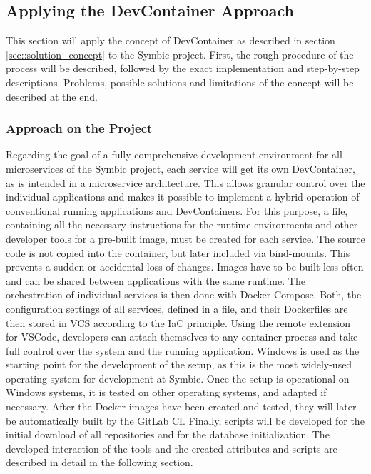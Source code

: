     \subsection{Applying the DevContainer Approach}\label{ssec::apply}
    This section will apply the concept of DevContainer as described in section \ref{sec::solution_concept} to the Symbic project. First, the rough procedure of the process will be described, followed by the exact implementation and step-by-step descriptions. Problems, possible solutions and limitations of the concept will be described at the end.

        \subsubsection{Approach on the Project}\label{ssec::imp_approach}
        Regarding the goal of a fully comprehensive development environment for all microservices of the Symbic project, each service will get its own DevContainer, as is intended in a microservice architecture. This allows granular control over the individual applications and makes it possible to implement a hybrid operation of conventional running applications and DevContainers. For this purpose, a  file, containing all the necessary instructions for the runtime environments and other developer tools for a pre-built image, must be created for each service. The source code is not copied into the container, but later included via bind-mounts. This prevents a sudden or accidental loss of changes. Images have to be built less often and can be shared between applications with the same runtime. The orchestration of individual services is then done with Docker-Compose. Both, the configuration settings of all services, defined in a  file, and their Dockerfiles are then stored in \ac{VCS} according to the \ac{IaC} principle. Using the remote extension for \ac{VSCode}, developers can attach themselves to any container process and take full control over the system and the running application.\newline
        Windows is used as the starting point for the development of the setup, as this is the most widely-used operating system for development at Symbic. Once the setup is operational on Windows systems, it is tested on other operating systems, and adapted if necessary. After the Docker images have been created and tested, they will later be automatically built by the GitLab \ac{CI}. Finally, scripts will be developed for the initial download of all repositories and for the database initialization. The developed interaction of the tools and the created attributes and scripts are described in detail in the following section.

